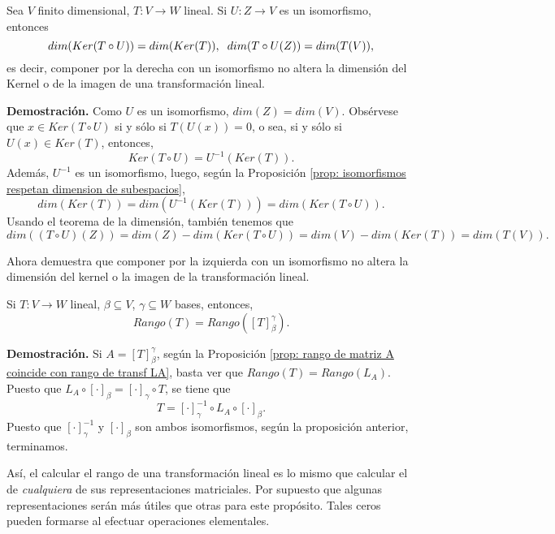 \begin{prop}
Sea $V$ finito dimensional, $T: V \longrightarrow W$ lineal. 
Si $U: Z \longrightarrow V$ es un isomorfismo, entonces
\[
dim(Ker(T \circ U)) = dim(Ker(T)), 
\hspace{0.2cm} dim(T\circ U (Z)) = dim(T (V)),
\]
es decir, componer por la derecha con un isomorfismo no altera
la dimensión del Kernel o de la imagen de una transformación lineal.
\end{prop}
\noindent
\textbf{Demostración.}
Como $U$ es un isomorfismo, $dim(Z) = dim(V)$.
Obsérvese que $x \in Ker(T \circ U)$ si y sólo si 
$T(U(x)) = 0$, o sea, si y sólo si $U(x) \in Ker(T)$, entonces,
\[
Ker(T \circ U) = U^{-1}(Ker(T)).
\]
Además, $U^{-1}$ es un isomorfismo, luego, según
la Proposición \ref{prop: isomorfismos respetan dimension de subespacios},
\[
dim(Ker(T)) = dim(U^{-1}(Ker(T))) = dim(Ker(T \circ U)).
\]
Usando el teorema de la dimensión, también tenemos que
\[
dim((T \circ U)(Z)) = dim(Z) - dim(Ker(T \circ U))
= dim(V) - dim(Ker(T)) = dim(T(V)).
\]
\QEDB
\vspace{0.2cm}

 Ahora demuestra que componer por la izquierda
con un isomorfismo no altera la dimensión del kernel o la imagen
de la transformación lineal.


\begin{prop}
	\label{prop: rango de transf lineal es rango de repr matr cualquiera}
Si $T: V \longrightarrow W$ lineal, $\beta \subseteq V$,
$\gamma \subseteq W$ bases, entonces,
\begin{equation}
	Rango(T) = Rango([T]_{\beta}^{\gamma}).
\end{equation}
\end{prop}
\noindent
\textbf{Demostración.}
Si $A = [T]_{\beta}^{\gamma}$,
según la Proposición 
\ref{prop: rango de matriz A coincide con rango de transf LA},
basta ver que $Rango(T) = Rango(L_{A})$.
Puesto que $L_{A} \circ [\cdot]_{\beta} = [\cdot]_{\gamma} \circ T$,
se tiene que 
\[
T = [\cdot]_{\gamma}^{-1} \circ L_{A} \circ [\cdot]_{\beta}.
\]
Puesto que $[\cdot]_{\gamma}^{-1}$ y $[\cdot]_{\beta}$ son ambos
isomorfismos, según la proposición anterior, terminamos.
\QEDB
\vspace{0.2cm}

Así, el calcular el rango de una transformación lineal es lo 
mismo que calcular el de \textit{cualquiera} de sus representaciones
matriciales. Por supuesto que algunas representaciones serán más 
útiles que otras para este propósito. 
Tales ceros pueden formarse al efectuar operaciones elementales.

